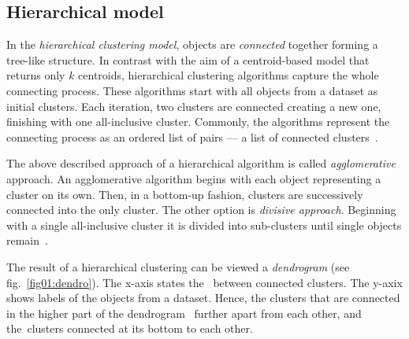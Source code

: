 \subsection{Hierarchical model}

In the \emph{hierarchical clustering model}, objects are \emph{connected} together forming a tree-like structure. In contrast with the aim of a centroid-based model that returns only $k$ centroids, hierarchical clustering algorithms capture the whole connecting process. These algorithms start with all objects from a dataset as initial clusters. Each iteration, two clusters are connected creating a new one, finishing with one all-inclusive cluster. Commonly, the algorithms represent the connecting process as an ordered list of pairs --- a list of connected clusters~\cite{karypis1999chameleon}.

The above described approach of a hierarchical algorithm is called \emph{agglomerative} approach. An agglomerative algorithm begins with each object representing a cluster on its own. Then, in a bottom-up fashion, clusters are successively connected into the only cluster. The other option is \emph{divisive approach}. Beginning with a single all-inclusive cluster it is divided into sub-clusters until single objects remain~\cite{rokach2005clustering}. 

The result of a hierarchical clustering can be viewed  a \emph{dendrogram} (see fig.~\ref{fig01:dendro}). The x-axis states the \ between connected clusters. The y-axix shows labels of the objects from a dataset. Hence, the clusters that are connected in the higher part of the dendrogram \ further apart from each other, and the~clusters connected at its bottom  to each other. 


